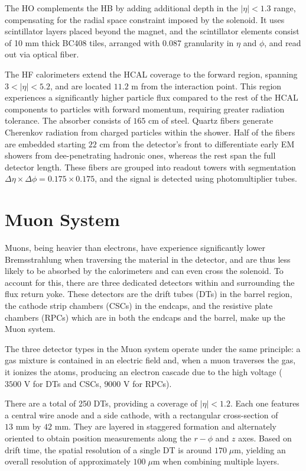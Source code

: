The HO complements the HB by adding additional depth in the $|\eta| <1.3$ range, compensating for the radial space constraint imposed by the solenoid. It uses scintillator layers placed beyond the magnet, and the scintillator elements consist of 10 mm thick BC408 tiles, arranged with 0.087 granularity in $\eta$ and $\phi$, and read out via optical fiber.

The HF calorimeters extend the HCAL coverage to the forward region, spanning $3 <|\eta|<5.2$, and are located $11.2 \text{ m}$ from the interaction point. This region experiences a significantly higher particle flux compared to the rest of the HCAL components to particles with forward momentum, requiring greater radiation tolerance. The absorber consists of $165 \text{ cm}$ of steel. Quartz fibers generate Cherenkov radiation from charged particles within the shower. Half of the fibers are embedded starting $22 \text{ cm}$ from the detector's front to differentiate early EM showers from dee-penetrating hadronic ones, whereas the rest span the full detector length. These fibers are grouped into readout towers with segmentation $\Delta \eta \times \Delta \phi = 0.175\times0.175$, and the signal is detected using photomultiplier tubes.

\section{Muon System}

Muons, being heavier than electrons, have experience significantly lower Bremsstrahlung when traversing the material in the detector, and are thus less likely to be absorbed by the calorimeters and can even cross the solenoid. To account for this, there are three dedicated detectors within and surrounding the flux return yoke. These detectors are the drift tubes (DTs) in the barrel region, the cathode strip chambers (CSCs) in the endcaps, and the resistive plate chambers (RPCs) which are in both the endcaps and the barrel, make up the Muon system.

The three detector types in the Muon system operate under the same principle: a gas mixture is contained in an electric field and, when a muon traverses the gas, it ionizes the atoms, producing an electron cascade due to the high voltage ($3500 \text{ V}$ for DTs and CSCs, $9000 \text{ V}$ for RPCs).

There are a total of 250 DTs, providing a coverage of $|\eta| <1.2$. Each one features a central wire anode and a side cathode, with a rectangular cross-section of $13 \text{ mm}$ by $42 \text{ mm}$. They are layered in staggered formation and alternately oriented to obtain position measurements along the $r-\phi$ and $z$ axes. Based on drift time, the spatial resolution of a single DT is around $170 \;\mu\text{m}$, yielding an overall resolution of approximately $100 \;\mu\text{m}$ when combining multiple layers.

